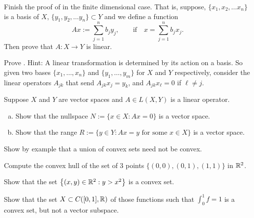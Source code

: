\begin{exercise}
Finish the proof of  in the finite dimensional case.
That is, suppose,
$\{ x_1, x_2,\ldots x_n \}$ is a basis of $X$,
$\{ y_1, y_2,\ldots y_n \} \subset Y$ and we define a
function
\begin{equation*}
Ax := \sum_{j=1}^n b_j y_j, \qquad \text{if} \quad x=\sum_{j=1}^n b_j x_j .
\end{equation*}
Then prove that $A \colon X \to Y$ is linear.
\end{exercise}


\begin{exercise}
Prove .  Hint: A linear transformation is determined by
its action on a basis.  So given two bases
$\{ x_1,\ldots,x_n \}$ and
$\{ y_1,\ldots,y_m \}$ for $X$ and $Y$ respectively, consider the linear
operators $A_{jk}$ that send $A_{jk} x_j = y_k$, and 
$A_{jk} x_\ell = 0$ if $\ell \not= j$.
\end{exercise}

\begin{exercise}[Easy]
Suppose $X$ and $Y$ are vector spaces and $A \in L(X,Y)$ is a linear
operator.
\begin{enumerate}[a)]
\item
Show that the nullspace $N := \{ x \in X : Ax = 0 \}$ is a
vector space.
\item
Show that the range $R := \{ y \in Y : Ax = y \text{ for some $x \in X$} \}$ is a
vector space.
\end{enumerate}
\end{exercise}

\begin{exercise}[Easy]
Show by example that a union of convex sets need not be convex.
\end{exercise}

\begin{exercise}
Compute the convex hull of the set of 3 points
$\bigl\{ (0,0), (0,1), (1,1) \bigr\}$
in ${\mathbb{R}}^2$.
\end{exercise}

\begin{exercise}
Show that the set $\bigl\{ (x,y) \in {\mathbb{R}}^2 : y > x^2 \bigr\}$ is a convex set.
\end{exercise}

\begin{exercise}
Show that the set $X \subset C([0,1],{\mathbb{R}})$ of those functions such 
that $\int_0^1 f = 1$ is a convex set, but not a vector subspace.
\end{exercise}



